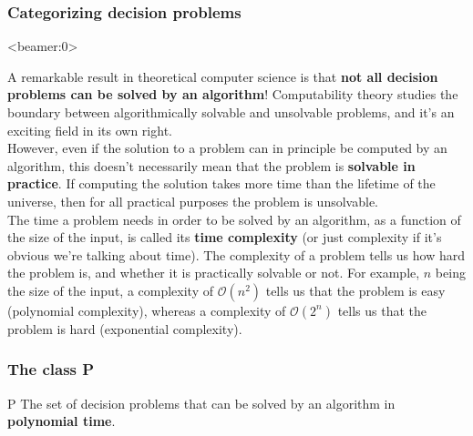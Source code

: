 \documentclass[handout, 12pt]{beamer}
\newcommand{\bigo}[1]{\mathcal{O}\mathopen{}\left(#1\right)\mathclose{}}
\begin{document}
\begin{frame}

\frametitle{Categorizing decision problems}
\centering
{}

\end{frame}

\begin{frame}<beamer:0>

\footnotesize
A remarkable result in theoretical computer science is that \textbf{not all decision problems can be solved by an algorithm}! Computability theory studies the boundary between algorithmically solvable and unsolvable problems, and it's an exciting field in its own right.
\\[0.6em]
However, even if the solution to a problem can in principle be computed by an algorithm, this doesn't necessarily mean that the problem is \textbf{solvable in practice}. If computing the solution takes more time than the lifetime of the universe, then for all practical purposes the problem is unsolvable.
\\[0.6em]
The time a problem needs in order to be solved by an algorithm, as a function of the size of the input, is called its \textbf{time complexity} (or just complexity if it's obvious we're talking about time). The complexity of a problem tells us how hard the problem is, and whether it is practically solvable or not. For example, $n$ being the size of the input, a complexity of $\bigo{n^2}$ tells us that the problem is easy (polynomial complexity), whereas a complexity of $\bigo{2^n}$ tells us that the problem is hard (exponential complexity).

\end{frame}

\begin{frame}

\frametitle{The class P}

\begin{block}{P}
The set of decision problems that can be solved by an algorithm in \textbf{polynomial time}.
\end{block}

\end{frame}
\end{document}
